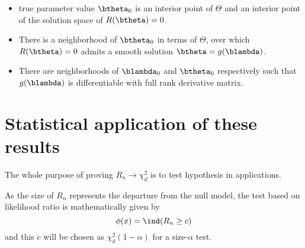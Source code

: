 \begin{itemize}

\item
 true parameter value $\btheta_0$ is
an interior point of $\Theta$ and an interior point 
of the solution space of $R(\btheta) = 0$. 

\item
There is a neighborhood of $\btheta_0$ in terms of
$\Theta$, over which $R(\btheta) = 0$ admits
a smooth solution $\btheta = g(\blambda)$.

\item
There are neighborhoods of $\blambda_0$ and $\btheta_0$ respectively
such that $g(\blambda)$ is differentiable with full rank derivative matrix.
\end{itemize}

\section{Statistical application of these results}

The whole purpose of proving $R_n \to \chi_d^2$ is to test hypothesis
in applications.

As the size of $R_n$ represents the departure from the null model,
the test based on likelihood ratio is mathematically given by
\[
\phi(x) = \ind(R_n \geq c)
\]
and this $c$ will be chosen as $\chi^2_d(1-\alpha)$ for a size-$\alpha$ test.


